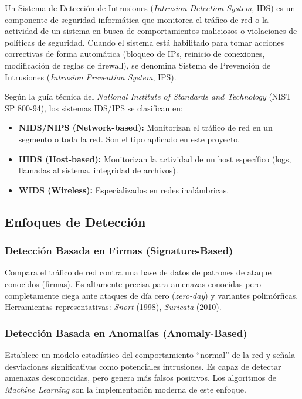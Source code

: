 \documentclass[12pt, letterpaper, oneside]{report}
\begin{document}
Un Sistema de Detección de Intrusiones (\textit{Intrusion Detection System}, IDS) es un componente de seguridad informática que monitorea el tráfico de red o la actividad de un sistema en busca de comportamientos maliciosos o violaciones de políticas de seguridad. Cuando el sistema está habilitado para tomar acciones correctivas de forma automática (bloqueo de IPs, reinicio de conexiones, modificación de reglas de firewall), se denomina Sistema de Prevención de Intrusiones (\textit{Intrusion Prevention System}, IPS).

Según la guía técnica del \textit{National Institute of Standards and Technology} (NIST SP 800-94), los sistemas IDS/IPS se clasifican en:

\begin{itemize}[leftmargin=*]
  \item \textbf{NIDS/NIPS (Network-based):} Monitorizan el tráfico de red en un segmento o toda la red. Son el tipo aplicado en este proyecto.
  \item \textbf{HIDS (Host-based):} Monitorizan la actividad de un host específico (logs, llamadas al sistema, integridad de archivos).
  \item \textbf{WIDS (Wireless):} Especializados en redes inalámbricas.
\end{itemize}

\subsection{Enfoques de Detección}

\subsubsection{Detección Basada en Firmas (Signature-Based)}
Compara el tráfico de red contra una base de datos de patrones de ataque conocidos (firmas). Es altamente precisa para amenazas conocidas pero completamente ciega ante ataques de día cero (\textit{zero-day}) y variantes polimórficas. Herramientas representativas: \textit{Snort} (1998), \textit{Suricata} (2010).

\subsubsection{Detección Basada en Anomalías (Anomaly-Based)}
Establece un modelo estadístico del comportamiento ``normal'' de la red y señala desviaciones significativas como potenciales intrusiones. Es capaz de detectar amenazas desconocidas, pero genera más falsos positivos. Los algoritmos de \textit{Machine Learning} son la implementación moderna de este enfoque.
\end{document}
